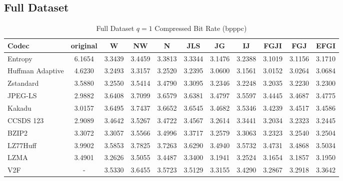 \documentclass{article}
\begin{document}
\subsection{Full Dataset}
\begin{table}[h!]
    \centering
    \caption{Full Dataset $q=1$ Compressed Bit Rate (bpppc)}
    \begin{tabular}{|l|cccccccccc|}
        \hline
        Codec &  original &      W &     NW &      N &    JLS &     JG &     IJ &   FGJI &    FGJ &   EFGI \\
        \hline
        Entropy &  6.1654 & 3.3439 & 3.4459 & 3.3813 & 3.3344 & 3.1476 & 3.2388 & 3.1019 & 3.1156 & 3.1710 \\ \hline
        Huffman Adaptive                                &    4.6230 & 3.2493 & 3.3157 &  3.2520 &  3.2395 & 3.0600 &  3.1561 &  3.0152 &  3.0264 &  3.0684 \\
        Zstandard                              &    3.5880 & 3.2550 & 3.5414 & 3.4790 & 3.3095 & 3.2346 & 3.2248 & 3.2035 & 3.2230 & 3.2300 \\
        JPEG-LS                                &    2.9882 & 3.6408 & 3.7099 & 3.6579 & 3.6381 & 3.4797 & 3.5597 & 3.4445 & 3.4687 & 3.4775 \\
        Kakadu                        &    3.0157 & 3.6495 & 3.7437 & 3.6652 & 3.6545 & 3.4682 & 3.5346 & 3.4239 & 3.4517 & 3.4586 \\
        CCSDS 123&    2.9089 & 3.4642 & 3.5267 & 3.4722 & 3.4567 & 3.2614 & 3.3441 & 3.2034 & 3.2323 & 3.2445 \\
        BZIP2                              &    3.3072 & 3.3057 & 3.5566 & 3.4996 & 3.3717 & 3.2579 & 3.3063 & 3.2323 & 3.2540 & 3.2504 \\
        LZ77Huff                       &    3.9902 & 3.5853 & 3.7825 & 3.7263 & 3.6290 & 3.4940 & 3.5732 & 3.4731 & 3.4868 & 3.5034 \\
        LZMA                            &    3.4901 & 3.2626 & 3.5055 & 3.4487 & 3.3400 & 3.1941 & 3.2524 & 3.1654 & 3.1857 & 3.1950 \\
        V2F                     &   - & 3.5330 & 3.6455 & 3.5723 & 3.5129 & 3.3155 & 3.4290 & 3.2867 & 3.2918 & 3.3642 \\
        \hline
    \end{tabular}


\end{table}
\end{document}
